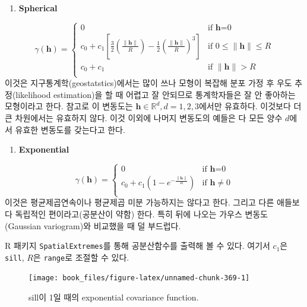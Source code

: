 \documentclass[b5paper,]{scrbook}
\providecommand{\tightlist}{%
  \setlength{\itemsep}{0pt}\setlength{\parskip}{0pt}}
\theoremstyle{plain}
\theoremstyle{definition}
\numberwithin{equation}{section}
\begin{document}
\begin{enumerate}
\def\labelenumi{\arabic{enumi}.}
\setcounter{enumi}{1}
\tightlist
\item
  \textbf{Spherical}
\end{enumerate}

\[
\gamma(\mathbf{h})= \left\{ \begin{array}{ll}
0 & \textrm{if $\mathbf{h}$=0}\\
c_{0}+c_{1}[\frac{3}{2}(\frac{\| \mathbf{h}\|}{R})-\frac{1}{2}(\frac{\| \mathbf{h}\|}{R})^{3}] & \textrm{if $0 \leq \|\mathbf{h}\|\leq R$}\\
c_{0}+c_{1} & \textrm{if $\|\mathbf{h}\|>R$}\\
\end{array} \right.
\]
이것은 지구통계학(geostatstics)에서는 많이 쓰나 모형이 복잡해 분포 가정 후 우도 추정(likelihood estimation)을 할 때 어렵고 잘 안되므로 통계학자들은 잘 안 좋아하는 모형이라고 한다. 참고로 이 변동도는 \(\mathbf{h} \in \mathbb{R}^{d}, d=1,2,3\)에서만 유효하다. 이것보다 더 큰 차원에서는 유효하지 않다. 이것 이외에 나머지 변동도의 예들은 다 모든 양수 \(d\)에서 유효한 변동도를 갖는다고 한다.

\begin{enumerate}
\def\labelenumi{\arabic{enumi}.}
\setcounter{enumi}{2}
\tightlist
\item
  \textbf{Exponential}
\end{enumerate}

\[
\gamma(\mathbf{h})= \left\{ \begin{array}{ll}
0 & \textrm{if $\mathbf{h}$=0}\\
c_{0}+c_{1}(1-e^{-\frac{\|\mathbf{h}\|}{R}}) & \textrm{if $\mathbf{h}\neq 0$}\\
\end{array} \right.
\]
이것은 평균제곱연속이나 평균제곱 미분 가능하지는 않다고 한다. 그리고 다른 애들보다 독립적인 편이라고(공분산이 약함) 한다. 특히 뒤에 나오는 가우스 변동도(Gaussian variogram)와 비교했을 때 덜 부드럽다.

R 패키지 \texttt{SpatialExtremes}를 통해 공분산함수를 출력해 볼 수 있다. 여기서 \(c_{1}\)은 \texttt{sill}, \(R\)은 \texttt{range}로 조절할 수 있다.

\begin{figure}

{\centering \texttt{[image: book\_files/figure-latex/unnamed-chunk-369-1]} 

}

\caption{sill이 1일 때의 exponential covariance function.}\label{fig:unnamed-chunk-369}
\end{figure}
\end{document}
